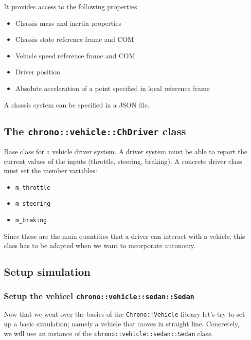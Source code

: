 It provides access to the following properties

\begin{itemize}
\item Chassis mass and inertia properties
\item Chassis state reference frame and COM
\item Vehicle speed reference frame and COM
\item Driver position
\item Absolute acceleration of a point specified in local reference frame
\end{itemize}

A chassis system can be specified in a JSON file.

\subsection{ The \lstinline{chrono::vehicle::ChDriver} class}

Base class for a vehicle driver system.
A driver system must be able to report the current values of the inputs (throttle, steering, braking). 
A concrete driver class must set the member variables:

\begin{itemize}
\item \lstinline{m_throttle}
\item \lstinline{m_steering} 
\item \lstinline{m_braking}
\end{itemize}
Since these are the main quantities that a driver can interact with a vehicle, this class has to be adapted
when we want to incorporate autonomy. 


\subsection{Setup simulation}

\subsubsection{Setup the vehicel \lstinline{chrono::vehicle::sedan::Sedan}}

Now that we went over the basics of the \lstinline{Chrono::Vehicle} library let's try to set up a basic simulation; namely a vehicle that moves in straight line.
Concretely, we will use an instance of the \lstinline{chrono::vehicle::sedan::Sedan} class. 



